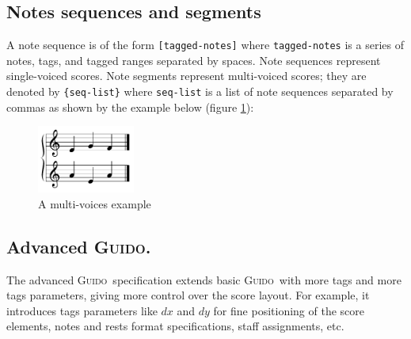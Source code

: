 \documentclass[twoside,10pt,a4paper]{article}
\newenvironment{gmncode}		{\vspace{-2mm}\small\verbatim}{\endverbatim\vspace{-2mm}}
\newcommand{\Guido}		{\textsc{Guido}}
\newcommand{\code}[1]		{{\small \texttt{#1}}}
\newcommand{\codeindent}	{\\ \hspace*{9mm}}
\begin{document}
\subsection{Notes sequences and segments}
A note sequence is of the form \verb+[tagged-notes]+ where \code{tagged-notes} is a series of notes, tags, and tagged ranges separated by spaces. Note sequences represent single-voiced scores.
Note segments represent multi-voiced scores; they are denoted by \verb+{seq-list}+ where \code{seq-list} is a list of note sequences separated by commas as shown by the example below (figure \ref{fig:voices}):
\codeindent\code{ \{ [ e g f ], [ a e a ] \} }
\begin{figure}[h]
	\centering \includegraphics[width=32mm]{rsrc/voices}
 \caption{A multi-voices example}
 \label{fig:voices}
\end{figure}


\subsection{Advanced \Guido.}
The advanced \Guido\ specification extends basic \Guido\ with more tags and more tags parameters, giving more control over the score layout.
For example, it introduces tags parameters like $dx$ and $dy$ for fine positioning of the score elements, notes and rests format specifications, staff assignments, etc. 
%
%
\end{document}
